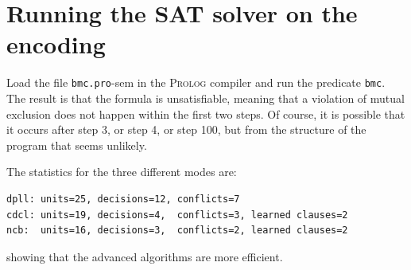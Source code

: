 \documentclass[11pt]{report}
\newcommand*{\p}[1]{\textup{\texttt{#1}}}
\begin{document}

\section{Running the SAT solver on the encoding}

Load the file \p{bmc.pro}-sem in the \textsc{Prolog} compiler and run the predicate \p{bmc}. The result is that the formula is unsatisfiable, meaning that a violation of mutual exclusion does not happen within the first two steps. Of course, it is possible that it occurs after step 3, or step 4, or step 100, but from the structure of the program that seems unlikely.

The statistics for the three different modes are:
\begin{verbatim}
dpll: units=25, decisions=12, conflicts=7
cdcl: units=19, decisions=4,  conflicts=3, learned clauses=2
ncb:  units=16, decisions=3,  conflicts=2, learned clauses=2
\end{verbatim}
showing that the advanced algorithms are more efficient.
\end{document}
